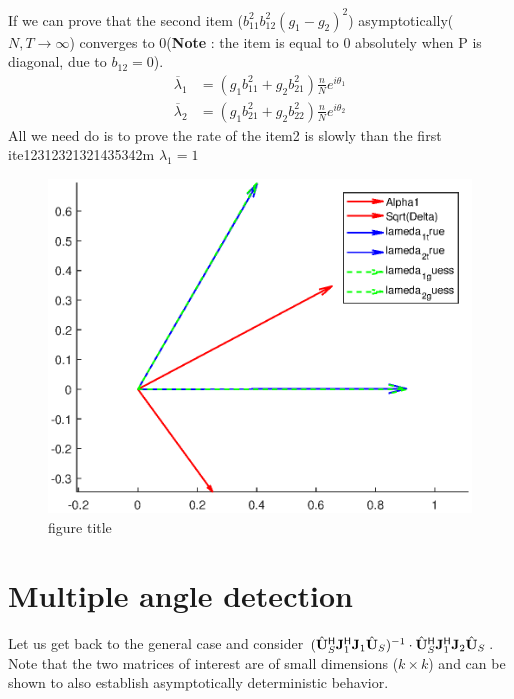 \documentclass[11pt,a4paper]{article}
\begin{document}
If we can prove that the second item ($b_{11}^2b_{12}^2(g_1-g_2)^2$)  asymptotically($N,T \rightarrow \infty$) converges to 0(\textbf{Note} : the item is equal to 0 absolutely when P is diagonal,  due to $b_{12} = 0$).
\begin{equation}
    \begin{aligned}
        \overline{\lambda}_1 &= (g_1b_{11}^2 + g_2 b_{21}^2)\frac{n}{N} e^{i\theta_1}\\ \overline{\lambda}_2 &= (g_1b_{21}^2 + g_2 b_{22}^2)\frac{n}{N} e^{i\theta_2}
    \end{aligned}
\end{equation}
All we need do is to prove the rate of the item2 is slowly than the first ite12312321321435342m $\lambda_1 =1 $
\begin{figure}[htbp]
    \centering
    \includegraphics[scale=0.2]{1233.eps}
    \caption{figure title}
    \label{figure}
\end{figure}
    

\section{Multiple angle detection}

Let us get back to the general case and consider $(\hat {{\mathbf{U}}}_S^{\sf H} {\mathbf{J}}_1^{\sf H} {\mathbf{J}}_1 \hat {{\mathbf{U}}}_S )^{-1} \cdot \hat {{\mathbf{U}}}_S^{\sf H} {\mathbf{J}}_1^{\sf H} {\mathbf{J}}_2 \hat {{\mathbf{U}}}_S$. Note that the two matrices of interest are of small dimensions ($k \times k$) and can be shown to also establish asymptotically deterministic behavior.
\end{document}
